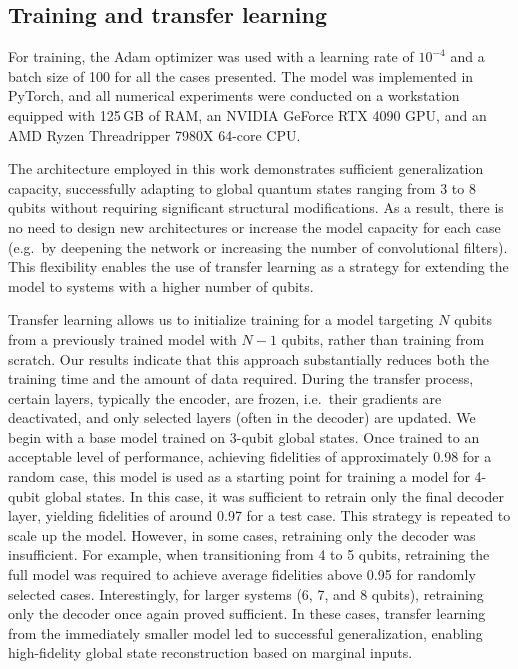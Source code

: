 \subsection{Training and transfer learning}
\label{sec:qmp-training}

For training, the Adam optimizer was used with a learning rate of $10^{-4}$ and a batch size of 100 for all the cases presented. The model was implemented in PyTorch, and all numerical experiments were conducted on a workstation equipped with 125\,GB of RAM, an NVIDIA GeForce RTX 4090 GPU, and an AMD Ryzen Threadripper 7980X 64-core CPU.

The architecture employed in this work demonstrates sufficient generalization capacity, successfully adapting to global quantum states ranging from 3 to 8 qubits without requiring significant structural modifications. As a result, there is no need to design new architectures or increase the model capacity for each case (e.g.\ by deepening the network or increasing the number of convolutional filters). This flexibility enables the use of transfer learning as a strategy for extending the model to systems with a higher number of qubits.

Transfer learning allows us to initialize training for a model targeting $N$ qubits from a previously trained model with $N-1$ qubits, rather than training from scratch. Our results indicate that this approach substantially reduces both the training time and the amount of data required. During the transfer process, certain layers, typically the encoder, are frozen, i.e.\ their gradients are deactivated, and only selected layers (often in the decoder) are updated. We begin with a base model trained on 3-qubit global states. Once trained to an acceptable level of performance, achieving fidelities of approximately 0.98 for a random case, this model is used as a starting point for training a model for 4-qubit global states. In this case, it was sufficient to retrain only the final decoder layer, yielding fidelities of around 0.97 for a test case. This strategy is repeated to scale up the model. However, in some cases, retraining only the decoder was insufficient. For example, when transitioning from 4 to 5 qubits, retraining the full model was required to achieve average fidelities above 0.95 for randomly selected cases. Interestingly, for larger systems (6, 7, and 8 qubits), retraining only the decoder once again proved sufficient. In these cases, transfer learning from the immediately smaller model led to successful generalization, enabling high-fidelity global state reconstruction based on marginal inputs.

